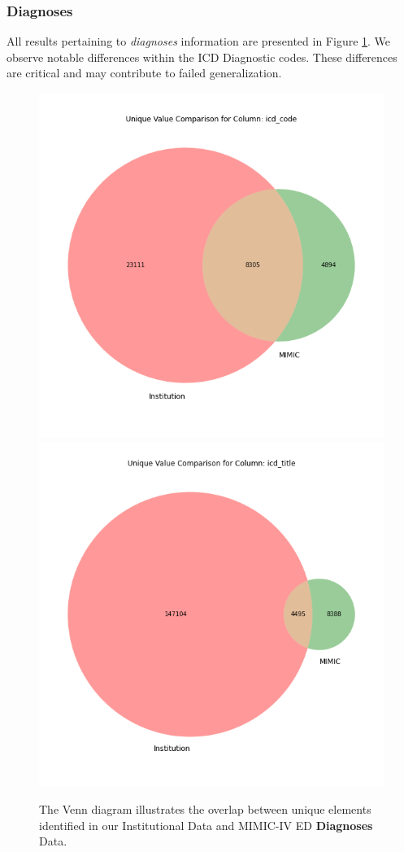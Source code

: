 \documentclass[pmlr]{jmlr}%
\begin{document}
 \subsubsection*{Diagnoses}
All results pertaining to \textit{diagnoses }information are presented in Figure \ref{app2}. We observe notable differences within the ICD Diagnostic codes. These differences are critical and may contribute to failed generalization.
 
 \begin{figure}[h!]
   \centering 
   \includegraphics[width=4.5in]{plots/icd_code_venn.png} 
   \includegraphics[width=4.5in]{plots/icd_title_venn.png} 
   \caption{The Venn diagram illustrates the overlap between unique elements identified in our Institutional Data and MIMIC-IV ED \textbf{Diagnoses} Data.}
   \label{app2} 
 \end{figure} 
\end{document}
